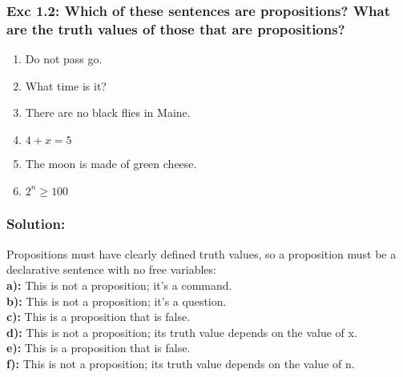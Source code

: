 \subsubsection*{Exc 1.2: Which of these sentences are propositions? What are the
truth values of those that are propositions?}
\begin{enumerate}[label=(\alph*)]
\item Do not pass go.
\item What time is it?
\item There are no black flies in Maine.
\item $4 + x = 5$
\item The moon is made of green cheese.
\item $2^n \geq 100$
\end{enumerate}
\subsubsection*{Solution:}
Propositions must have clearly defined truth values, so a proposition must be a declarative sentence with no
free variables:
\\
\textbf{a):} This is not a proposition; it’s a command.
\\
\textbf{b):} This is not a proposition; it’s a question.
\\
\textbf{c):} This is a proposition that is false.
\\
\textbf{d):} This is not a proposition; its truth value depends on the value of x.
\\
\textbf{e):} This is a proposition that is false.
\\
\textbf{f):} This is not a proposition; its truth value depends on the value of n.